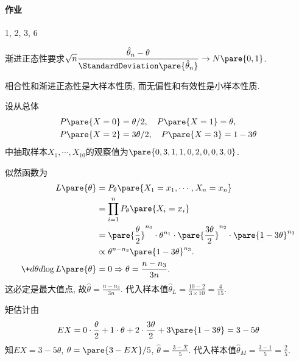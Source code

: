 \documentclass[../Statistics.tex]{subfiles}
\begin{document}
\paragraph{作业} %
\label{par:作业}

1, 2, 3, 6


\begin{remark}
    渐进正态性要求$\displaystyle \sqrt{n}\frac{\hat{\theta}_n - \theta}{\StandardDeviation\pare{\hat\theta_n}}\rightarrow N\pare{0,1}$.
\end{remark}
\begin{remark}
    相合性和渐进正态性是大样本性质, 而无偏性和有效性是小样本性质.
\end{remark}
\begin{sample}
    \begin{ex}
        设从总体
        \begin{align*}
            & P\pare{X=0} = \theta/2,\quad P\pare{X=1} = \theta,\\ & P\pare{X=2} = 3\theta/2,\quad P\pare{X=3} = 1-3\theta
        \end{align*}
        中抽取样本$X_1,\cdots,X_{10}$的观察值为$\pare{0,3,1,1,0,2,0,0,3,0}$.
        \begin{cenum}
            \item 似然函数为
            \begin{align*}
                L\pare{\theta} &= P_\theta\pare{X_1=x_1,\cdots,X_n = x_n} \\
                &= \prod_{i=1}^n P_\theta\pare{X_i = x_i} \\
                &= \pare{\frac{\theta}{2}}^{n_0}\cdot\theta^{n_1}\cdot\pare{\frac{3\theta}{2}}^{n_2}\cdot\pare{1-3\theta}^{n_3} \\
                &\propto \theta^{n-n_3}\pare{1-3\theta}^{n_3}. \\
                \+d{\theta}d{\log L\pare{\theta}} &= 0 \Rightarrow \theta = \frac{n-n_3}{3n}.
            \end{align*}
            这必定是最大值点, 故$\hat\theta = \displaystyle \frac{n-n_3}{3n}$. 代入样本值$\displaystyle \hat\theta_L = \frac{10-2}{3\times 10} = \frac{4}{15}$.
            \item 矩估计由
            \[ EX = 0\cdot \frac{\theta}{2} + 1\cdot \theta + 2\cdot \frac{3\theta}{2} + 3\pare{1-3\theta} = 3-5\theta \]
            知$EX = 3-5\theta$, $\theta = \pare{3-EX}/5$, $\hat\theta = \displaystyle \frac{3-\overbar{X}}{5}$. 代入样本值$\hat{\theta}_M = \displaystyle \frac{3-1}{5} = \frac{2}{5}$.

\end{cenum}
\end{ex}
\end{sample}
\end{document}

